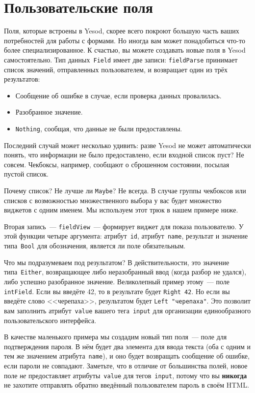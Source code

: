 \section{Пользовательские поля}
Поля, которые встроены в Yesod, скорее всего покроют большую часть ваших
потребностей для работы с формами. Но иногда вам может понадобиться что-то
более специализированное.  К счастью, вы можете создавать новые поля в Yesod
самостоятельно. Тип данных~\lstinline'Field' имеет две записи:
\lstinline'fieldParse' принимает список значений, отправленных пользователем,
и возвращает один из трёх результатов:
\begin{itemize}
    \item Сообщение об ошибке в случае, если проверка данных провалилась.
    \item Разобранное значение.
    \item \lstinline'Nothing', сообщая, что данные не были предоставлены.
\end{itemize}

Последний случай может несколько удивить: разве Yesod не может автоматически
понять, что информации не было предоставлено, если входной список пуст? Не
совсем. Чекбоксы, например, сообщают о сброшенном состоянии, посылая пустой
список.

Почему список? Не лучше ли \lstinline{Maybe}? Не всегда. В случае группы
чекбоксов или списков с возможностью множественного выбора у вас будет
множество виджетов с одним именем. Мы используем этот трюк в нашем примере
ниже.

Вторая запись~--- \lstinline'fieldView'~--- формирует виджет для показа
пользователю. У этой функции четыре аргумента: атрибут~\texttt{id},
атрибут~\texttt{name}, результат и значение типа~\lstinline'Bool' для
обозначения, является ли поле обязательным.

Что мы подразумеваем под результатом? В действительности, это значение
типа~\lstinline'Either', возвращающее либо неразобранный ввод (когда разбор не
удался), либо успешно разобранное значение. Великолепный пример этому~--- поле
\lstinline'intField'.  Если вы введёте 42, то в результате будет
\lstinline'Right 42'. Но если вы введёте слово <<черепаха>>, результатом будет
\lstinline'Left "черепаха"'. Это позволит вам заполнить атрибут~\texttt{value}
вашего тега~\texttt{input} для организации единообразного пользовательского
интерфейса.

В качестве маленького примера мы создадим новый тип поля~--- поле для
подтверждения пароля. В нём будет два элемента для ввода текста (оба с одним и
тем же значением атрибута~\texttt{name}), и оно будет возвращать сообщение об
ошибке, если пароли не совпадают. Заметьте, что в отличие от большинства
полей, новое поле \emph{не} предоставляет атрибуты~\texttt{value} для
тегов~\texttt{input}, потому что вы \textbf{никогда} не захотите отправлять
обратно введённый пользователем пароль в своём HTML.

